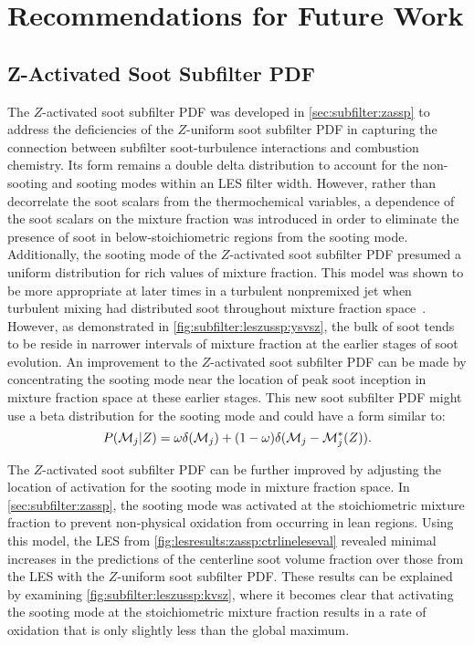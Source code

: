 \section{Recommendations for Future Work}
\label{sec:conclusion:future}

\subsection{Z-Activated Soot Subfilter PDF}
\label{sec:conclusion:future:zassp}

The $Z$-activated soot subfilter PDF was developed in \cref{sec:subfilter:zassp} to address the deficiencies of the $Z$-uniform soot subfilter PDF in capturing the connection between subfilter soot-turbulence interactions and combustion chemistry. Its form remains a double delta distribution to account for the non-sooting and sooting modes within an LES filter width. However, rather than decorrelate the soot scalars from the thermochemical variables, a dependence of the soot scalars on the mixture fraction was introduced in order to eliminate the presence of soot in below-stoichiometric regions from the sooting mode. Additionally, the sooting mode of the $Z$-activated soot subfilter PDF presumed a uniform distribution for rich values of mixture fraction. This model was shown to be more appropriate at later times in a turbulent nonpremixed jet when turbulent mixing had distributed soot throughout mixture fraction space~\cite{attili2014}. However, as demonstrated in \cref{fig:subfilter:leszussp:ysvsz}, the bulk of soot tends to be reside in narrower intervals of mixture fraction at the earlier stages of soot evolution. An improvement to the $Z$-activated soot subfilter PDF can be made by concentrating the sooting mode near the location of peak soot inception in mixture fraction space at these earlier stages. This new soot subfilter PDF might use a beta distribution for the sooting mode and could have a form similar to:
\begin{equation}\label{eq:conclusion:future:zassp:dd}
  P(\mathcal{M}_j|Z) = \omega\delta(\mathcal{M}_j) + (1 - \omega)\delta(\mathcal{M}_j - \mathcal{M}_j^*(Z)).
\end{equation}

The $Z$-activated soot subfilter PDF can be further improved by adjusting the location of activation for the sooting mode in mixture fraction space. In \cref{sec:subfilter:zassp}, the sooting mode was activated at the stoichiometric mixture fraction to prevent non-physical oxidation from occurring in lean regions. Using this model, the LES from \cref{fig:lesresults:zassp:ctrlineleseval} revealed minimal increases in the predictions of the centerline soot volume fraction over those from the LES with the $Z$-uniform soot subfilter PDF. These results can be explained by examining \cref{fig:subfilter:leszussp:kvsz}, where it becomes clear that activating the sooting mode at the stoichiometric mixture fraction results in a rate of oxidation that is only slightly less than the global maximum.


